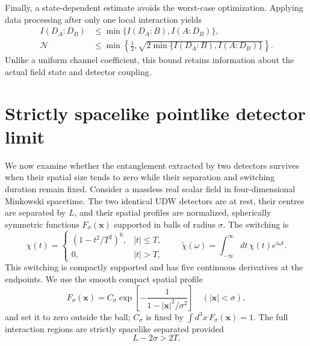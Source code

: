 \documentclass[pdflatex,sn-mathphys-num]{sn-jnl}
\begin{document}
Finally, a state-dependent estimate avoids the worst-case optimization. Applying data processing after only one local interaction yields
\begin{align}
I(D_A:D_B)&\leq\min\{I(D_A:B),I(A:D_B)\},\nonumber\\
\mathcal N&\leq\min\left\{\frac12,
\sqrt{2\min\{I(D_A:B),I(A:D_B)\}}\right\}.
\label{eq:one-sided-negativity-bound}
\end{align}
Unlike a uniform channel coefficient, this bound retains information about the actual field state and detector coupling. 





\section{Strictly spacelike pointlike detector limit}
\label{app:pointlike-detectors}


We now examine whether the entanglement extracted by two detectors survives when their spatial size tends to zero while their separation and switching duration remain fixed. Consider a massless real scalar field in four-dimensional Minkowski spacetime. The two identical UDW detectors are at rest, their centres are separated by $L$, and their spatial profiles are normalized, spherically symmetric functions $F_\sigma(\mathbf x)$ supported in balls of radius $\sigma$. The switching is
\begin{equation}
\chi(t)=
\begin{cases}
(1-t^2/T^2)^6,& |t|\leq T,\\
0,& |t|>T,
\end{cases}
\qquad
\widetilde\chi(\omega)=\int_{-\infty}^{\infty}dt\,\chi(t)e^{i\omega t}.
\label{eq:pointlike-switch}
\end{equation}
This switching is compactly supported and has five continuous derivatives at the endpoints. We use the smooth compact spatial profile
\begin{equation}
F_\sigma(\mathbf x)=C_\sigma
\exp\!\left[-\frac{1}{1-|\mathbf x|^2/\sigma^2}\right]
\quad (|\mathbf x|<\sigma),
\label{eq:pointlike-profile}
\end{equation}
and set it to zero outside the ball; $C_\sigma$ is fixed by $\int d^3x\,F_\sigma(\mathbf x)=1$. The full interaction regions are strictly spacelike separated provided
\begin{equation}
L-2\sigma>2T.
\label{eq:pointlike-spacelike}
\end{equation}
\end{document}
